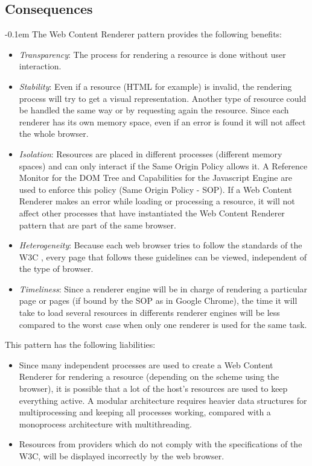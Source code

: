 \documentclass[]{acmlarge}
\begin{document}
  \subsection*{Consequences}
  \leftskip-0.1em The Web Content Renderer pattern provides the following benefits:
  \begin{itemize}\leftskip0.2em
    \item \textit{Transparency}: The process for rendering a resource is done without user interaction.
    \item \textit{Stability}: Even if a resource (HTML for example) is invalid, the rendering process will try to get a visual representation. Another type of resource could be handled the same way or by requesting again the resource. Since each renderer has its own memory space, even if an error is found it will not affect the whole browser.
    \item \textit{Isolation}: Resources are placed in different processes (different memory spaces) and can only interact if the Same Origin Policy allows it. A Reference Monitor for the DOM Tree and Capabilities for the Javascript Engine are used to enforce this policy (Same Origin Policy - SOP). If a Web Content Renderer makes an error while loading or processing a resource, it will not affect other processes that have instantiated the Web Content Renderer pattern that are part of the same browser.
    \item \textit{Heterogeneity}: Because each web browser tries to follow the standards of the W3C \cite{w3c}, every page that follows these guidelines can be viewed, independent of the type of browser.
    \item \textit{Timeliness}: Since a renderer engine will be in charge of rendering a particular page or pages (if bound by the SOP as in Google Chrome), the time it will take to load several resources in differents renderer engines will be less compared to the worst case when only one renderer is used for the same task.
  \end{itemize}
  This pattern has the following liabilities:
  \begin{itemize}\leftskip0.2em
    \item Since many independent processes are used to create a Web Content Renderer for rendering a resource (depending on the scheme using the browser), it is possible that a lot of the host's resources are used to keep everything active. A modular architecture requires heavier data structures for multiprocessing and keeping all processes working, compared with a monoprocess architecture with multithreading.
    \item Resources from providers which do not comply with the specifications of the W3C, will be displayed incorrectly by the web browser.
  \end{itemize}
\end{document}
